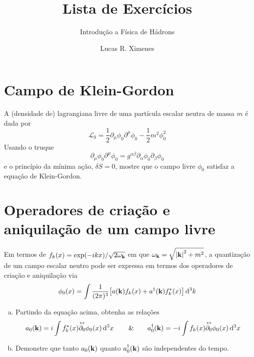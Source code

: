 \documentclass[a4paper, 11pt, oneside]{impression}
\title{Lista de Exercícios} %
\subtitle{Introdução a Física de Hádrons} %
\author{Lucas R. Ximenes} %
\begin{document}
\maketitle

\chapter{Campo de Klein-Gordon}\label{quest: one}

\begin{exercise}{}
    A (densidade de) lagrangiana livre de uma partícula escalar neutra de massa $m$ é dada por
        \begin{equation*}
            \mathcal{L}_{0} = \dfrac{1}{2}\partial_{\mu}\phi_{0}\partial^{\mu}\phi_{0} - \dfrac{1}{2}m^2\phi_{0}^2
        \end{equation*}
    Usando o truque
        \begin{equation*}
            \partial_{\mu}\phi_{0}\partial^{\mu}\phi_{0} = g^{\alpha\beta}\partial_{\alpha}\phi_{0}\partial_{\beta}\phi_{0}
        \end{equation*}
    e o princípio da mínima ação, $\delta S = 0$, mostre que o campo livre $\phi_{0}$ satisfaz a equação de Klein-Gordon.
\end{exercise}



\newpage

\chapter{Operadores de criação e aniquilação de um campo livre}\label{quest: two}

\begin{exercise}{}
    Em termos de $f_{k}(x) = \exp(-ikx)/\sqrt{2\omega_{\vb{k}}}$ em que $\omega_{\vb{k}} = \sqrt{\abs{\vb{k}}^2 + m^2}$, a quantização de um campo escalar neutro pode ser expressa em termos dos operadores de criação e aniquilação via
        \begin{equation*}
            \phi_{0}(x) = \int \dfrac{1}{(2\pi)^3}\qty[
                a(\vb{k}) f_{k}(x) +
                a^{\dagger}(\vb{k}) f_{k}^{\ast}(x)
            ] \dd[3]{k}
        \end{equation*}

    \begin{enumerate}[(a)]
        \item Partindo da equação acima, obtenha as relações
        \begin{equation*}
            a_{0}(\vb{k}) = i\int f_{k}^{\ast}(x)\overset{\leftrightarrow}{\partial_{0}}\phi_{0}(x) \dd[3]{x} \qquad \& \qquad 
            a_{0}^{\dagger}(\vb{k}) = -i\int f_{k}(x) \overset{\leftrightarrow}{\partial_{0}}\phi_{0}(x) \dd[3]{x}
        \end{equation*}

        \item Demonstre que tanto $a_{0}(\vb{k})$ quanto $a^{\dagger}_{0}(\vb{k})$ são independentes do tempo.
    \end{enumerate}
\end{exercise}
\end{document}
